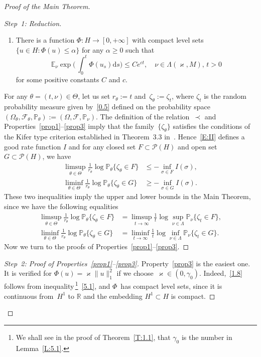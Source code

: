 \documentclass[10pt]{amsart}
\theoremstyle{definition}\newtheorem{defi}[theo]{Definition}\newtheorem{rema}[theo]{Remark}\newtheorem{exam}[theo]{Example}\newtheorem{exem}[theo]{Example}\newtheorem{nota}[theo]{Notation}
\newcommand{\R}{{\mathbb R}}
\newcommand{\IP}{{\mathbb P}}
\newcommand{\pP}{{\mathbb P}}
\newcommand{\E}{{\mathbb E}}
\newcommand{\FF}{{\mathcal F}}
\newcommand{\PP}{{\mathcal P}}
\newcommand{\vk}{{\varkappa}}
\newcommand{\ty}{\infty}
\newcommand{\dd}{\mathrm{d}}
\newenvironment{step}{\begin{proof}}{\let\qed\relax \end{proof}}
\newenvironment{proofc}[1][\proofname]{\begin{proof}[{#1}]}{\end{proof}}
\begin{document}
\begin{proofc}[Proof of the Main Theorem]
\begin{step}[Step~1: Reduction]
\begin{enumerate}
\item \label{prop3} There is a function $\varPhi : H \to [0,+\ty]$ with compact level sets $ \{u \in H : \varPhi(u)\le \alpha\}$ for any $\alpha\ge0$ such that
\begin{equation}\label{1.8}
\E_\nu\exp \biggl(\,\int_0^t\varPhi(u_s)\dd s\biggr)\le Ce^{c t},\quad \nu\in\Lambda(\vk,M),\, t>0
\end{equation}
for some positive constants $C$ and $c$.
\end{enumerate}
For any $\theta=(t,\nu)\in \Theta$, let us set $r_\theta:=t$ and~$\zeta_\theta:=\zeta_t$, where $\zeta_t$ is the random probability measure given by~\eqref{0.5} defined on the probability space~$(\Omega_\theta,\FF_\theta,\IP_\theta):=(\Omega,\FF,\IP_\nu)$. The definition of the relation~$\prec$ and Properties~\eqref{prop1}--\eqref{prop3} imply that the family~$\{\zeta_\theta\}$ satisfies the conditions of the Kifer type criterion established in Theorem~3.3 in~\cite{JNPS-2014}. Hence~\eqref{E:II} defines a good rate function $I$ and for any closed set $F\subset \PP(H)$ and open set $G\subset \PP(H)$, we have
\begin{align*}
\limsup_{\theta\in\Theta} \frac{1}{r_\theta}\log\pP_\theta\{\zeta_\theta\in F\}&\le -\inf_{\sigma\in F} I (\sigma),\\
\liminf_{\theta\in\Theta} \frac1{r_\theta}\log\pP_\theta\{\zeta_\theta\in G\}&\ge -\inf_{\sigma\in G} I (\sigma).
\end{align*}
These two inequalities imply the upper and lower bounds in the Main Theorem, since we have the following equalities
\begin{align*}
\limsup_{\theta\in\Theta} \frac{1}{r_\theta}\log\pP_\theta\{\zeta_\theta\in F\}&=\limsup_{t\to\infty} \frac1t\log \sup_{\nu\in\Lambda} \pP_\nu\{\zeta_t\in F\},\\
\liminf_{\theta\in\Theta} \frac1{r_\theta}\log\pP_\theta\{\zeta_\theta\in G\}&=\liminf_{t\to\infty} \frac1t\log \inf_{\nu\in\Lambda}\pP_\nu\{\zeta_t\in G\}.
\end{align*}
Now we turn to the proofs of Properties~\eqref{prop1}--\eqref{prop3}.
\end{step}

\begin{proof}[Step~2: Proof of Properties~\eqref{prop1}--\eqref{prop3}]
Property~\eqref{prop3} is the easiest one. It is verified for $\varPhi(u)=\varkappa \|u\|_1^2$ if we choose~$\varkappa\in (0,\gamma_0)$. Indeed,~\eqref{1.8} follows from inequality\,\footnote{We shall see in the proof of Theorem~\ref{T:1.1}, that $\gamma_0$ is the number in Lemma~\ref{L:5.1}.}~\eqref{5.1}, and $\varPhi$~has compact level sets, since it is continuous from~$H^1$ to $\R$ and the embedding $H^1\subset H$ is compact.


\end{proof}
\end{proofc}
\end{document}
